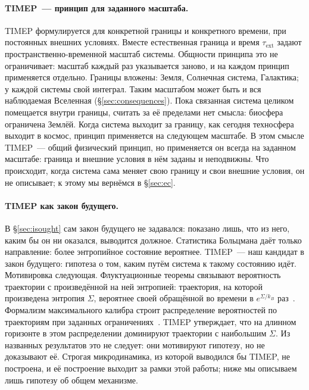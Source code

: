\documentclass[11pt,a4paper]{article}
\newcommand{\Sref}[1]{\hyperref[#1]{\S\ref{#1}}}
\begin{document}
\paragraph{TIMEP~--- принцип для заданного масштаба.}
TIMEP формулируется для конкретной границы и конкретного времени, при постоянных внешних условиях. Вместе естественная граница и время $\tau_{\mathrm{ext}}$ задают пространственно-временной масштаб системы. Общности принципа это не ограничивает: масштаб каждый раз указывается заново, и на каждом принцип применяется отдельно. Границы вложены: Земля, Солнечная система, Галактика; у каждой системы свой интеграл. Таким масштабом может быть и вся наблюдаемая Вселенная (\Sref{sec:consequences}). Пока связанная система целиком помещается внутри границы, считать за её пределами нет смысла: биосфера ограничена Землёй. Когда система выходит за границу, как сегодня техносфера выходит в космос, принцип применяется на следующем масштабе. В этом смысле TIMEP~--- общий физический принцип, но применяется он всегда на заданном масштабе: граница и внешние условия в нём заданы и неподвижны. Что происходит, когда система сама меняет свою границу и свои внешние условия, он не описывает; к этому мы вернёмся в \Sref{sec:ec}.

\paragraph{TIMEP как закон будущего.}
В \Sref{sec:isought} сам закон будущего не задавался: показано лишь, что из него, каким бы он ни оказался, выводится должное. Статистика Больцмана даёт только направление: более энтропийное состояние вероятнее. TIMEP~--- наш кандидат в закон будущего: гипотеза о том, каким путём система к такому состоянию идёт. Мотивировка следующая. Флуктуационные теоремы связывают вероятность траектории с произведённой на ней энтропией: траектория, на которой произведена энтропия $\Sigma$, вероятнее своей обращённой во времени в $e^{\Sigma/k_B}$ раз~\cite{crooks1999,seifert2012}. Формализм максимального калибра строит распределение вероятностей по траекториям при заданных ограничениях~\cite{ghosh2020}. TIMEP утверждает, что на длинном горизонте в этом распределении доминируют траектории с наибольшим $\Sigma$. Из названных результатов это не следует: они мотивируют гипотезу, но не доказывают её. Строгая микродинамика, из которой выводился бы TIMEP, не построена, и её построение выходит за рамки этой работы; ниже мы описываем лишь гипотезу об общем механизме.
\end{document}
